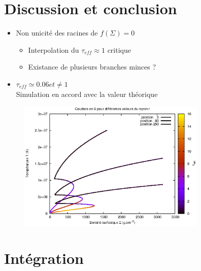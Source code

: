 \documentclass[french]{beamer}
\begin{document}
\section{Discussion et conclusion}
\begin{frame}

   \begin{itemize}
      \item Non unicité des racines de $f(\Sigma) = 0$
      \\
         \begin{itemize}
            \item Interpolation du $\tau_{eff} \approx 1$ critique
            \item Existance de plusieurs branches minces ? 
         \end{itemize}  
      \item $\tau_{eff} \simeq 0.06 et \neq 1$ 
      \\
Simulation en accord avec la valeur théorique
   \end{itemize}
\end{frame}


\begin{frame}

   \begin{figure}[htb!]
      \includegraphics[width=9cm]{figures/S_curves_tau.eps}
   \end{figure}
\end{frame}






\section{Intégration}
\end{document}
